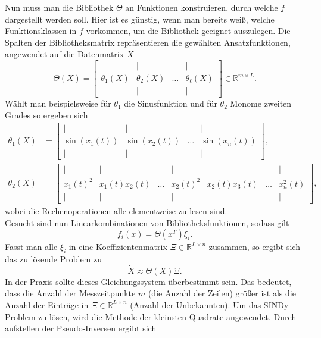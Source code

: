 \documentclass[arbeit=studie,oneside,BCOR=12mm]{ArbeitRST}
\begin{document}
Nun muss man die Bibliothek $\Theta$ an Funktionen konstruieren, durch welche $f$ dargestellt werden soll. Hier ist es günstig, wenn man bereits weiß, welche Funktionsklassen in $f$ vorkommen, um die Bibliothek geeignet auszulegen.
Die Spalten der Bibliotheksmatrix repräsentieren die gewählten Ansatzfunktionen, angewendet auf die Datenmatrix $X$ 
\begin{equation}
\Theta(X) = \begin{bmatrix}
		\mid & \mid & & \mid \\
		\theta_1(X) & \theta_2(X) & \dots & \theta_\ell(X) \\
		\mid & \mid & & \mid 
	\end{bmatrix}\in\mathbb{R}^{m\times L}.
\end{equation} 
Wählt man beispielsweise für $\theta_1$ die Sinusfunktion und für $\theta_2$ Monome zweiten Grades so ergeben sich 
\begin{align}
\theta_1(X) &= \begin{bmatrix}
		\mid 	  & \mid     		  &          & \mid             \\
		\sin(x_1(t)) & \sin(x_2(t))   & \dots    & \sin(x_n(t)) \\
		\mid      & \mid     		  &          & \mid              
	\end{bmatrix},\\
\theta_2(X) &= \begin{bmatrix}
		\mid & \mid & & \mid & \mid & & \mid \\
		x_1(t)^2 & x_1(t)x_2(t) & \dots & x_2(t)^2 & x_2(t)x_3(t) & \dots & x_n^2(t) \\
		\mid & \mid & & \mid & \mid & & \mid
	\end{bmatrix},	
\end{align}
wobei die Rechenoperationen alle elementweise zu lesen sind. \\
Gesucht sind nun Linearkombinationen von Bibliotheksfunktionen, sodass gilt
\begin{equation}
f_i(x) = \Theta(x^T)\xi_i.
\end{equation}
Fasst man alle $\xi_i$ in eine Koeffizientenmatrix $\Xi\in\mathbb{R}^{L\times n}$ zusammen, so ergibt sich das zu lösende Problem zu 
\begin{equation}
\dot{X} \approx \Theta(X)\Xi.
\end{equation}
In der Praxis sollte dieses Gleichungssystem überbestimmt sein. Das bedeutet, dass die Anzahl der Messzeitpunkte $m$ (die Anzahl der Zeilen) größer ist als die Anzahl der Einträge in $\Xi\in\mathbb{R}^{L\times n}$ (Anzahl der Unbekannten). Um das SINDy-Problem zu lösen, wird die Methode der kleinsten Quadrate angewendet. Durch aufstellen der Pseudo-Inversen ergibt sich 
\end{document}
